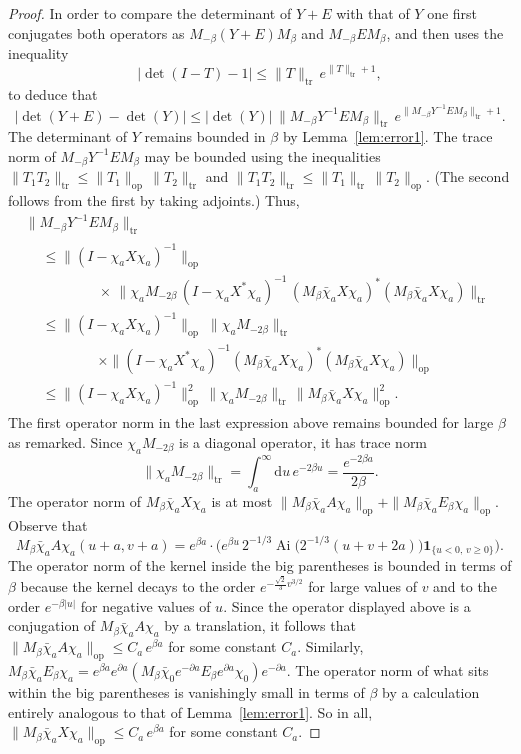 \documentclass[AHL,Unicode,longabstracts]{cedram}
\newcommand*{\dd}{\mathrm{d}}
\newcommand*{\du}{\dd u}
\DeclareMathOperator{\tr}{tr}
\DeclareMathOperator{\op}{op}
\DeclareMathOperator{\Ai}{Ai}
\newcommand{\ind}[1]{\mathbf{1}_{\{ #1 \}}}
\begin{document}
\begin{proof}
In order to compare the determinant of $Y+E$ with that of $Y$ one first conjugates both operators as $M_{-\beta}(Y+E) M_{\beta}$ and $M_{-\beta} E M_{\beta}$, and then uses the inequality
\[
\mathopen|\det(I-T) - 1| \leq \|T\|_{\tr}\, e^{\|T\|_{\tr}+1},
\]
to deduce that
\[
\left | \det(Y + E) - \det(Y) \right| \leq
\mathopen| \det(Y)| \, \| M_{-\beta}Y^{-1} E M_{\beta}\|_{\tr} \, e^{\| M_{-\beta}Y^{-1} E M_{\beta}\|_{\tr}+1}.
\]
The determinant of $Y$ remains bounded in $\beta$ by Lemma~\ref{lem:error1}.
\goodbreak
The trace norm of $M_{-\beta}Y^{-1} E M_{\beta}$ may be bounded using the inequalities $\| T_1 T_2 \|_{\tr}\leq \| T_1 \|_{\op}\, \| T_2\|_{\tr}$ and $\| T_1 T_2 \|_{\tr} \leq \| T_1 \|_{\tr}\, \| T_2\|_{\op}$. (The second follows from the first by taking adjoints.) Thus,
\begin{multline}\label{eqn:error2b}
\| M_{-\beta}Y^{-1} E M_{\beta}\|_{\tr}\\
\begin{aligned}
&\leq \|(I - \chi_a X \chi_a)^{-1} \|_{\op} \\
& \qquad\qquad\times \, \|\chi_a M_{-2\beta}\, (I-\chi_a X^{*} \chi_a)^{-1} \, (M_{\beta}\bar{\chi}_aX\chi_a)^{*} (M_{\beta}\bar{\chi}_aX\chi_a)\|_{\tr} \\
& \leq \|(I - \chi_a X \chi_a)^{-1} \|_{\op} \; \|\chi_a M_{-2\beta}\|_{\tr}\\
& \qquad\qquad\times \|(I-\chi_a X^{*} \chi_a)^{-1} (M_{\beta}\bar{\chi}_aX\chi_a)^{*} (M_{\beta}\bar{\chi}_aX\chi_a)\|_{\op} \\
& \leq \|(I - \chi_a X \chi_a)^{-1} \|_{\op}^2 \, \| \chi_a M_{-2\beta} \|_{\tr}\, \| M_{\beta}\bar{\chi}_aX\chi_a\|^2_{\op}.
\end{aligned}
\end{multline}
The first operator norm in the last expression above remains bounded for large $\beta$ as remarked. Since $\chi_a M_{-2\beta}$ is a diagonal operator, it has trace norm
\[
\|\chi_a M_{-2\beta} \|_{\tr} = \int_a^{\infty} \du\, e^{-2\beta u} = \frac{e^{-2\beta a}}{2\beta}.
\]
The operator norm of $M_{\beta}\bar{\chi}_aX\chi_a$ is at most $\| M_{\beta} \bar{\chi}_aA\chi_a\|_{\op} + \|M_{\beta}\bar{\chi}_a E_{\beta} \chi_a\|_{\op}$. Observe that
\[
M_{\beta} \bar{\chi}_aA\chi_a(u+a,v+a) = e^{\beta a} \cdot
\Big(e^{\beta u} \, 2^{-1/3} \Ai \big(2^{-1/3}(u+v+2a)\big) \ind{u <0, \, v \geq 0} \Big).
\]
The operator norm of the kernel inside the big parentheses is bounded in terms of $\beta$ because the kernel decays to the order $e^{-\frac{\sqrt{2}}{3}v^{3/2}}$ for large values of $v$ and to the order $e^{-\beta |u|}$ for negative values of $u$. Since the operator displayed above is a conjugation of $M_{\beta} \bar{\chi}_aA\chi_a$ by a translation, it follows that $\| M_{\beta} \bar{\chi}_aA\chi_a\|_{\op} \leq C_a\, e^{\beta a}$ for some constant $C_a$. Similarly, $M_{\beta}\bar{\chi}_a E_{\beta} \chi_a = e^{\beta a} e^{\partial a}(M_{\beta} \bar{\chi}_0 e^{-\partial a} E_{\beta} e^{\partial a} \chi_0 ) e^{-\partial a}$. The operator norm of what sits within the big parentheses is vanishingly small in terms of $\beta$ by a calculation entirely analogous to that of Lemma~\ref{lem:error1}. So in all, $ \| M_{\beta}\bar{\chi}_aX\chi_a\|_{\op} \leq C_a\, e^{\beta a}$ for some constant $C_a$.


\end{proof}
\end{document}
